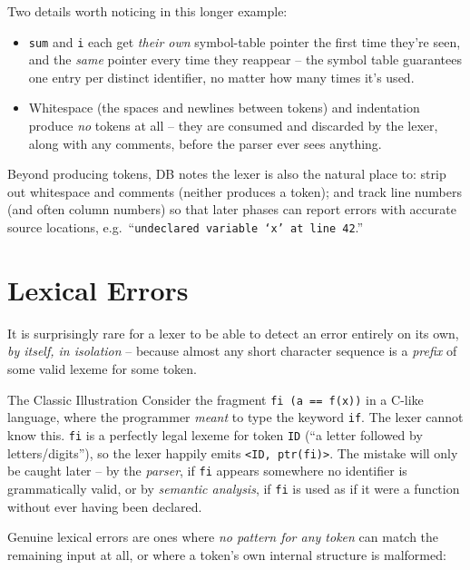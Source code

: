 \documentclass[11pt]{article}
\begin{document}
Two details worth noticing in this longer example:
\begin{itemize}
  \item \texttt{sum} and \texttt{i} each get \emph{their own} symbol-table pointer the first
  time they're seen, and the \emph{same} pointer every time they reappear -- the symbol table
  guarantees one entry per distinct identifier, no matter how many times it's used.
  \item Whitespace (the spaces and newlines between tokens) and indentation produce \emph{no}
  tokens at all -- they are consumed and discarded by the lexer, along with any comments, before
  the parser ever sees anything.
\end{itemize}

\begin{coreidea}
Beyond producing tokens, DB notes the lexer is also the natural place to: strip out whitespace
and comments (neither produces a token); and track line numbers (and often column numbers) so
that later phases can report errors with accurate source locations, e.g.\ ``\texttt{undeclared
variable `x' at line 42}.''
\end{coreidea}

\section{Lexical Errors}

\dbtag It is surprisingly rare for a lexer to be able to detect an error entirely on its own,
\emph{by itself, in isolation} -- because almost any short character sequence is a \emph{prefix}
of some valid lexeme for some token.

\begin{examplebox}{The Classic Illustration}
Consider the fragment \texttt{fi (a == f(x))} in a C-like language, where the programmer
\emph{meant} to type the keyword \texttt{if}. The lexer cannot know this. \texttt{fi} is a
perfectly legal lexeme for token \texttt{ID} (``a letter followed by letters/digits''), so the
lexer happily emits \texttt{<ID, ptr(fi)>}. The mistake will only be caught later -- by the
\emph{parser}, if \texttt{fi} appears somewhere no identifier is grammatically valid, or by
\emph{semantic analysis}, if \texttt{fi} is used as if it were a function without ever having
been declared.
\end{examplebox}

Genuine lexical errors are ones where \emph{no pattern for any token} can match the remaining
input at all, or where a token's own internal structure is malformed:
\end{document}

